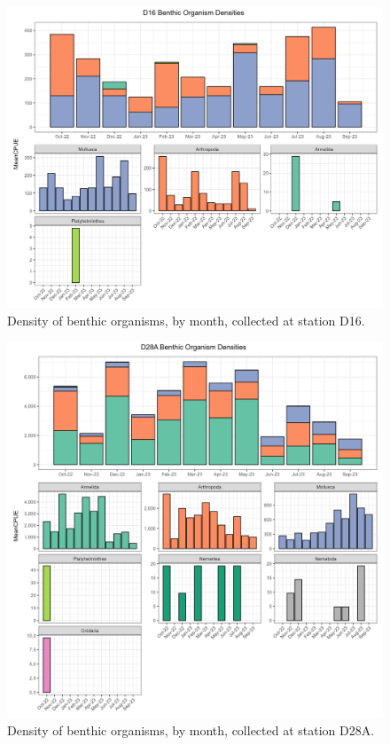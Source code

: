 \documentclass[
]{article}
\begin{document}
\begin{figure}

{\centering \includegraphics[width=9.84in,height=\textheight]{../figures/benthic_bar_d16.jpg}

}

\caption{\label{fig-benthic_d16}Density of benthic organisms, by month,
collected at station D16.}

\end{figure}

\begin{figure}

{\centering \includegraphics[width=9.84in,height=\textheight]{../figures/benthic_bar_d28a.jpg}

}

\caption{\label{fig-benthic_d28a}Density of benthic organisms, by month,
collected at station D28A.}

\end{figure}
\end{document}
